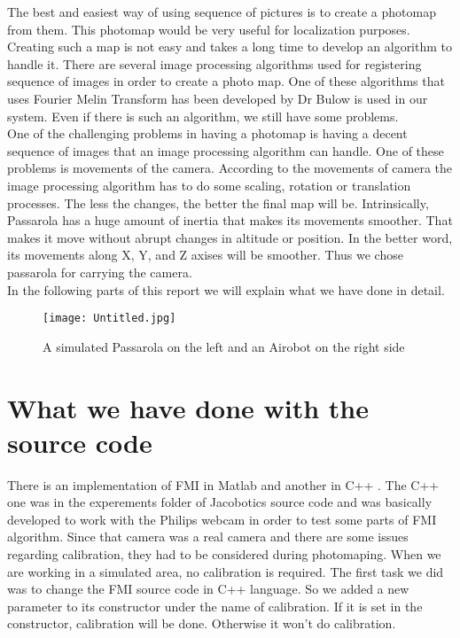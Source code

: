 \documentclass{article}
\begin{document}
The best and easiest way of using sequence of pictures is to create a photomap from them. This photomap would be very useful for localization purposes. Creating such a map is not easy and takes a long time to develop an algorithm to handle it. There are several image processing algorithms used for registering sequence of images in order to create a photo map. One of these algorithms that uses Fourier Melin Transform has been developed by Dr Bulow is used in our system. Even if there is such an algorithm, we still have some problems.\\

One of the challenging problems in having a photomap is having a decent sequence of images that an image processing algorithm can handle\cite{survey, img}. One of these problems is movements of the camera. According to the movements of camera the image processing algorithm has to do some scaling, rotation or translation processes. The less the changes, the better the final map will be. Intrinsically, Passarola has a huge amount of inertia that makes its movements smoother. That makes it move without abrupt changes in altitude or position. In the better word, its movements along X, Y, and Z axises will be smoother. Thus we chose passarola for carrying the camera.\\


In the following parts of this report we will explain what we have done in detail.\\

\begin{figure}
\begin{center}
\texttt{[image: Untitled.jpg]} 
\caption{A simulated Passarola on the left and an Airobot on the right side}
\end{center}
\end{figure}

\section{What we have done with the source code}

There is an implementation of FMI in Matlab and another in C++ \cite{shams2, mult}. The C++ one was in the experements folder of Jacobotics source code and was basically developed to work with the Philips webcam in order to test some parts of FMI algorithm. Since that camera was a real camera and there are some issues regarding calibration, they had to be considered during photomaping.  When we are working in a simulated area, no calibration is required\cite{shams3}. The first task we did was to change the FMI source code in C++ language. So we added a new parameter to its constructor under the name of calibration. If it is set in the constructor, calibration will be done. Otherwise it won't do calibration.\\ 
\end{document}
